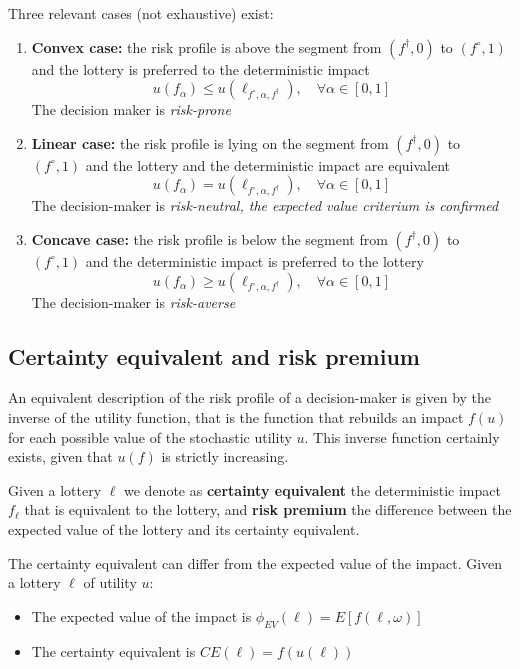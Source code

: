 Three relevant cases (not exhaustive) exist: 
\begin{enumerate}
	\item \textbf{Convex case:} the risk profile is above the segment from $(f^\dag, 0)$ to $(f^\circ, 1)$ and the lottery is preferred to the deterministic impact
	$$ u\left(f_\alpha\right) \leq u \left(\ell_{f^\circ, \alpha, f^\dag}\right), \quad \forall \alpha \in [0,1] $$
	The decision maker is \textit{risk-prone}
	
	\item \textbf{Linear case:} the risk profile is lying on the segment from $(f^\dag, 0)$ to $(f^\circ, 1)$ and the lottery and the deterministic impact are equivalent
	$$ u\left(f_\alpha\right) = u \left(\ell_{f^\circ, \alpha, f^\dag}\right), \quad \forall \alpha \in [0,1] $$
	The decision-maker is \textit{risk-neutral, the expected value criterium is confirmed}
	
	\item \textbf{Concave case:} the risk profile is below the segment from $(f^\dag, 0)$ to $(f^\circ, 1)$ and the deterministic impact is preferred to the lottery 
	$$ u\left(f_\alpha\right) \geq u \left(\ell_{f^\circ, \alpha, f^\dag}\right), \quad \forall \alpha \in [0,1] $$
	The decision-maker is \textit{risk-averse}
\end{enumerate}

\subsection{Certainty equivalent and risk premium}

An equivalent description of the risk profile of a decision-maker is given by the inverse of the utility function, that is the function that rebuilds an impact $f(u)$ for each possible value of the stochastic utility $u$. This inverse function certainly exists, given that $u(f)$ is strictly increasing. \\

\begin{definition}
	Given a lottery $\ell$ we denote as \textbf{certainty equivalent} the deterministic impact $f_\ell$ that is equivalent to the lottery, and \textbf{risk premium} the difference between the expected value of the lottery and its certainty equivalent.
\end{definition}

The certainty equivalent can differ from the expected value of the impact. Given a lottery $\ell$ of utility $u$: 
\begin{itemize}
	\item The expected value of the impact is $\phi_{EV} (\ell) = E \left[f(\ell, \omega)\right]$
	
	\item The certainty equivalent is $CE(\ell) = f(u(\ell))$
\end{itemize}

